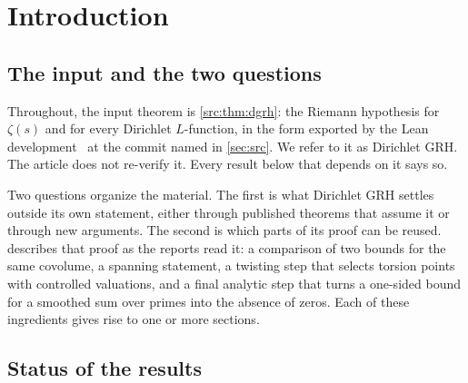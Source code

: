 \section{Introduction}\label{sec:intro}

\subsection{The input and the two questions}

Throughout, the input theorem is \cref{src:thm:dgrh}: the Riemann hypothesis for $\zeta(s)$
and for every Dirichlet $L$-function, in the form exported by the Lean development \repo\ at
the commit named in \cref{sec:src}. We refer to it as Dirichlet GRH. The article does not
re-verify it. Every result below that depends on it says so.

Two questions organize the material. The first is what Dirichlet GRH settles outside its own
statement, either through published theorems that assume it or through new arguments. The
second is which parts of its proof can be reused.  describes that
proof as the reports read it: a comparison of two bounds for the same covolume, a spanning
statement, a twisting step that selects torsion points with controlled valuations, and a
final analytic step that turns a one-sided bound for a smoothed sum over primes into the
absence of zeros. Each of these ingredients gives rise to one or more sections.

\subsection{Status of the results}

